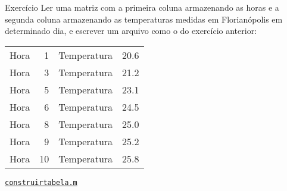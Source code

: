 \documentclass[hyperref={pdfpagelabels=false}]{beamer}
\begin{document}
\begin{frame}{Exercício}
  Ler uma matriz com a primeira coluna armazenando as horas e a segunda coluna armazenando as temperaturas medidas em Florianópolis em determinado dia, e escrever um arquivo como o do exercício anterior:

  \begin{center}
    \begin{tabular}{l r l r}
      Hora & 1 & Temperatura & 20.6\\
      Hora & 3 & Temperatura & 21.2\\
      Hora & 5 & Temperatura & 23.1\\
      Hora & 6 & Temperatura & 24.5\\
      Hora & 8 & Temperatura & 25.0\\
      Hora & 9 & Temperatura & 25.2\\
      Hora & 10 & Temperatura & 25.8
    \end{tabular}
  \end{center}

  \begin{center}
    \href{listings/construirtabela.m}{\underline{\texttt{construirtabela.m}}}
  \end{center}

\end{frame}
\end{document}

